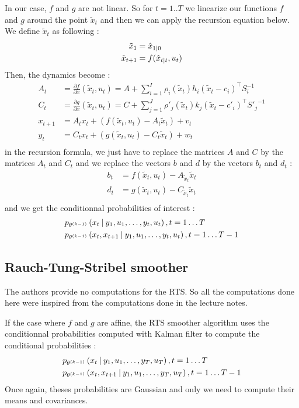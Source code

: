 In our case, $f$ and $g$ are not linear.
So for $t=1..T$ we linearize our functions $f$ and $g$ around the point $\tilde{x}_t$ and then we can apply the recursion equation below.
We define $\tilde{x}_t$ as following :
\begin{align*}
  \tilde{x}_1 &= \hat{x}_{1 \mathbin{\vert} 0}\\
  \tilde{x}_{t+1} &= f(\hat{x}_{t \mathbin{\vert} t}, u_t)\\
\end{align*}
Then, the dynamics become :
\begin{align*}
  A_t &= \frac{\partial f}{\partial x}(\tilde{x}_t, u_t) = A + \sum_{i=1}^I \rho_i(\tilde{x}_t) h_i (\tilde{x}_t - c_i)^{\top} S_i^{-1}\\
  C_t &= \frac{\partial g}{\partial x}(\tilde{x}_t, u_t) = C + \sum_{j=1}^J \rho'_j(\tilde{x}_t) k_j (\tilde{x}_t - c'_i)^{\top} {S'_j}^{-1}\\
  x_{t+1} &= A_{t} x_t + (f(\tilde{x}_t, u_t) - A_{t} \tilde{x}_t) + v_t\\
  y_t &= C_{t} x_t + (g(\tilde{x}_t, u_t) - C_{t}  \tilde{x}_t) + w_t\\
\end{align*}
in the recursion formula, we just have to replace the matrices $A$ and $C$ by the matrices $A_t$ and $C_t$  and we replace the vectors $b$ and $d$ by the vectors $b_t$ and $d_t$ :
\begin{align*}
  b_t &= f(\tilde{x}_t, u_t) - A_{\tilde{x}_t} \tilde{x}_t\\
  d_t &= g(\tilde{x}_t, u_t) - C_{\tilde{x}_t} \tilde{x}_t\\
\end{align*}
and we get the conditionnal probabilities of interest :
\begin{align*}
  &p_{\theta^{(k-1)}}\left(x_t \mathbin{\vert} y_1, u_1, \ldots, y_t, u_t \right), t=1 \ldots T\\
  &p_{\theta^{(k-1)}}\left(x_t, x_{t+1} \mathbin{\vert} y_1, u_1, \ldots, y_t, u_t \right), t=1 \ldots T-1\\
\end{align*}

\subsection{Rauch-Tung-Stribel smoother}
The authors provide no computations for the RTS.
So all the computations done here were inspired from the computations done in the lecture notes.

If the case where $f$ and $g$ are affine, the RTS smoother algorithm uses the conditionnal probabilities computed with Kalman filter to compute the conditional probabilities :
\begin{align*}
  &p_{\theta^{(k-1)}}\left(x_t \mathbin{\vert} y_1, u_1, \ldots, y_T, u_T \right), t=1 \ldots T\\
  &p_{\theta^{(k-1)}}\left(x_t, x_{t+1} \mathbin{\vert} y_1, u_1, \ldots, y_T, u_T \right), t=1 \ldots T-1\\
\end{align*}
Once again, theses probabilities are Gaussian and only we need to compute their means and covariances.


